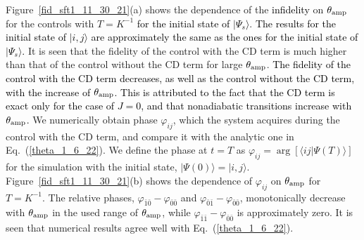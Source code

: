 \documentclass[%
 reprint,
 amsmath,amssymb,
 aps,
pra,
]{revtex4-2}
\begin{document}
Figure~\ref{fid_sft1_11_30_21}(a) shows the dependence of the \textcolor{black}{infidelity} on $\theta_{\rm amp}$ for the controls with $T=K^{-1}$ \textcolor{black}{for the initial state of $|\Psi_s\rangle$}. 
\textcolor{black}{ The results for the initial state of $|i,j\rangle$ are approximately the same as the ones for the initial state of $|\Psi_s\rangle$.}
It is seen that the fidelity of the control with the CD term is much higher than that of the control without the CD term for large $\theta_{\rm amp}$.
\textcolor{black}{The fidelity of the control with the CD term decreases, as well as the control without the CD term, with the increase of $\theta_{\rm amp}$. This is attributed to the fact that the CD term is exact only for the case of $J=0$, and that nonadiabatic transitions increase with $\theta_{\rm amp}$.}
We numerically obtain phase $\varphi_{ij}$, which the system acquires during the control with the CD term, and compare it with the analytic one in Eq.~(\ref{theta_1_6_22}).
We define the phase at $t=T$ as $\varphi_{ij} = \arg [ \langle ij | \Psi(T)\rangle ]$
for the simulation with the initial state, $| \Psi(0)\rangle = |i,j\rangle$. 
Figure~\ref{fid_sft1_11_30_21}(b) shows the dependence of $\varphi_{ij}$ on $\theta_{\rm amp}$ for $T=K^{-1}$.
The relative phases, $\varphi_{\bar{1}\bar{0}}-\varphi_{\bar{0}\bar{0}}$ and $\varphi_{\bar{0}\bar{1}}-\varphi_{\bar{0}\bar{0}}$, monotonically decrease with $\theta_{\rm amp}$ in the used range of $\theta_{\rm amp}$, while $\varphi_{\bar{1}\bar{1}}-\varphi_{\bar{0}\bar{0}}$ is approximately zero.
It is seen that numerical results agree well with Eq.~(\ref{theta_1_6_22}).
\end{document}
